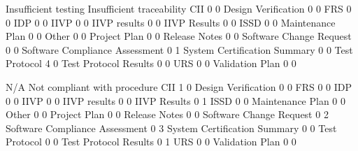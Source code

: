 \documentclass{article}
\begin{document}
\begin{Schunk}
\begin{Soutput}
                                 Insufficient testing Insufficient traceability
  CII                                               0                         0
  Design Verification                               0                         0
  FRS                                               0                         0
  IDP                                               0                         0
  IIVP                                              0                         0
  IIVP results                                      0                         0
  IIVP Results                                      0                         0
  ISSD                                              0                         0
  Maintenance Plan                                  0                         0
  Other                                             0                         0
  Project Plan                                      0                         0
  Release Notes                                     0                         0
  Software Change Request                           0                         0
  Software Compliance Assessment                    0                         1
  System Certification Summary                      0                         0
  Test Protocol                                     4                         0
  Test Protocol Results                             0                         0
  URS                                               0                         0
  Validation Plan                                   0                         0
                                
                                 N/A Not compliant with procedure
  CII                              1                            0
  Design Verification              0                            0
  FRS                              0                            0
  IDP                              0                            0
  IIVP                             0                            0
  IIVP results                     0                            0
  IIVP Results                     0                            1
  ISSD                             0                            0
  Maintenance Plan                 0                            0
  Other                            0                            0
  Project Plan                     0                            0
  Release Notes                    0                            0
  Software Change Request          0                            2
  Software Compliance Assessment   0                            3
  System Certification Summary     0                            0
  Test Protocol                    0                            0
  Test Protocol Results            0                            1
  URS                              0                            0
  Validation Plan                  0                            0
                                

\end{Soutput}
\end{Schunk}
\end{document}
